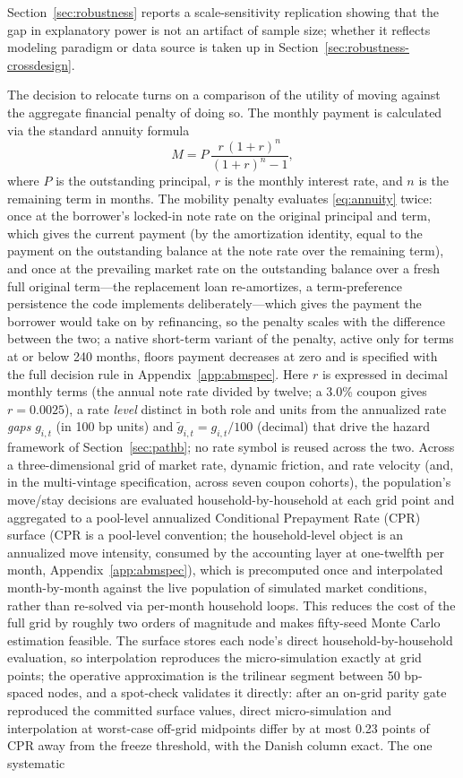 \documentclass[12pt]{article}
\begin{document}
Section~\ref{sec:robustness} reports a scale-sensitivity replication showing that the gap in explanatory power is not an artifact of sample size; whether it reflects modeling paradigm or data source is taken up in Section~\ref{sec:robustness-crossdesign}.

The decision to relocate turns on a comparison of the utility of moving against the aggregate financial penalty of doing so. The monthly payment is calculated via the standard annuity formula
\begin{equation}\label{eq:annuity}
M = P\,\frac{r\,(1+r)^{n}}{(1+r)^{n}-1},
\end{equation}
where $P$ is the outstanding principal, $r$ is the monthly interest rate, and $n$ is the remaining term in months. The mobility penalty evaluates \eqref{eq:annuity} twice: once at the borrower's locked-in note rate on the original principal and term, which gives the current payment (by the amortization identity, equal to the payment on the outstanding balance at the note rate over the remaining term), and once at the prevailing market rate on the outstanding balance over a fresh full original term---the replacement loan re-amortizes, a term-preference persistence the code implements deliberately---which gives the payment the borrower would take on by refinancing, so the penalty scales with the difference between the two; a native short-term variant of the penalty, active only for terms at or below 240 months, floors payment decreases at zero and is specified with the full decision rule in Appendix~\ref{app:abmspec}. Here $r$ is expressed in decimal monthly terms (the annual note rate divided by twelve; a 3.0\% coupon gives $r = 0.0025$), a rate \emph{level} distinct in both role and units from the annualized rate \emph{gaps} $g_{i,t}$ (in 100 bp units) and $\tilde g_{i,t} = g_{i,t}/100$ (decimal) that drive the hazard framework of Section~\ref{sec:pathb}; no rate symbol is reused across the two. Across a three-dimensional grid of market rate, dynamic friction, and rate velocity (and, in the multi-vintage specification, across seven coupon cohorts), the population's move/stay decisions are evaluated household-by-household at each grid point and aggregated to a pool-level annualized Conditional Prepayment Rate (CPR) surface (CPR is a pool-level convention; the household-level object is an annualized move intensity, consumed by the accounting layer at one-twelfth per month, Appendix~\ref{app:abmspec}), which is precomputed once and interpolated month-by-month against the live population of simulated market conditions, rather than re-solved via per-month household loops. This reduces the cost of the full grid by roughly two orders of magnitude and makes fifty-seed Monte Carlo estimation feasible. The surface stores each node's direct household-by-household evaluation, so interpolation reproduces the micro-simulation exactly at grid points; the operative approximation is the trilinear segment between 50 bp-spaced nodes, and a spot-check validates it directly: after an on-grid parity gate reproduced the committed surface values, direct micro-simulation and interpolation at worst-case off-grid midpoints differ by at most 0.23 points of CPR away from the freeze threshold, with the Danish column exact. The one systematic 
\end{document}
